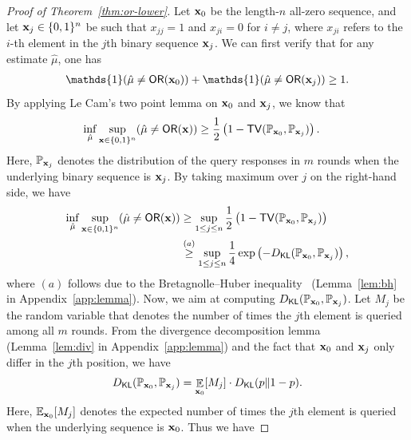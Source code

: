 \documentclass[journal, onecolumn]{IEEEtran}
\theoremstyle{plain}
\theoremstyle{definition}
\theoremstyle{remark}
\DeclareMathOperator\E{\mathbb{E}}
\let\P\relax
\DeclareMathOperator\P{\mathsf{P}}
\begin{document}
\begin{proof}[Proof of Theorem~\ref{thm:or-lower}]
Let ${\bf x}_0$ be the length-$n$ all-zero sequence, and let ${\bf x}_j \in \{0,1\}^n$ be such that $x_{jj} = 1$ and $x_{ji} = 0$ for $i \neq j$, where $x_{ji}$ refers to the $i$-th element in the $j$th binary sequence ${\bf x}_j$. We can first verify that for any estimate $\hat\mu$, one has
\begin{align*}
    \mathds{1}(\hat\mu \neq \mathsf{OR}({\bf x}_0)) +  \mathds{1}(\hat\mu \neq \mathsf{OR}({\bf x}_j)) \geq 1.
\end{align*}
By applying Le Cam's two point lemma on ${\bf x}_0$ and ${\bf x}_j$, we know that
\begin{align*}
      \inf_{\hat\mu} \sup_{{\bf x}\in\{0, 1\}^n} \P(\hat\mu \neq \mathsf{OR}({\bf x})) & \geq \frac{1}{2}\left(1-\mathsf{TV}(\mathbb{P}_{{\bf x}_0}, \mathbb{P}_{{\bf x}_j})\right). 
\end{align*}
Here, $\mathbb{P}_{{\bf x}_j}$ denotes the distribution of the query responses in $m$ rounds when the underlying binary sequence is ${\bf x}_j$. By taking maximum over $j$ on the right-hand side, we have
\begin{align*}
     \inf_{\hat\mu} \sup_{{\bf x}\in\{0, 1\}^n} \P(\hat\mu \neq \mathsf{OR}({\bf x})) & \geq \sup_{1\leq j\leq n}\frac{1}{2}\left(1-\mathsf{TV}(\mathbb{P}_{{\bf x}_0}, \mathbb{P}_{{\bf x}_j})\right)  \\ 
     & \stackrel{(a)}{\geq} \sup_{1\leq j\leq n} \frac{1}{4}\exp\left(-D_{\mathsf{KL}}(\mathbb{P}_{{\bf x}_0}, \mathbb{P}_{{\bf x}_j})\right),
\end{align*}
where $(a)$ follows due to the Bretagnolle–Huber inequality~\citep{bretagnolle79} (Lemma~\ref{lem:bh} in Appendix~\ref{app:lemma}). Now, we aim at computing $D_{\mathsf{KL}}(\mathbb{P}_{{\bf x}_0}, \mathbb{P}_{{\bf x}_j})$. Let $M_j$ be the random variable that denotes the number of times the $j$th element is queried among all $m$ rounds.  From the divergence decomposition lemma~\citep{auer1995gambling} (Lemma~\ref{lem:div} in Appendix~\ref{app:lemma}) and the fact that ${\bf x}_0$ and ${\bf x}_j$ only differ in the $j$th position, we have  
\begin{align*}
   D_{\mathsf{KL}}(\mathbb{P}_{{\bf x}_0}, \mathbb{P}_{{\bf x}_j}) = \E_{{\bf x}_0}[M_j] \cdot D_{\mathsf{KL}}(p\|1-p).
\end{align*}
Here, $\mathbb{E}_{{\bf x}_0}[M_j]$ denotes the expected number of times the $j$th element is queried when the underlying sequence is ${\bf x}_0$. Thus we have 

\end{proof}
\end{document}
